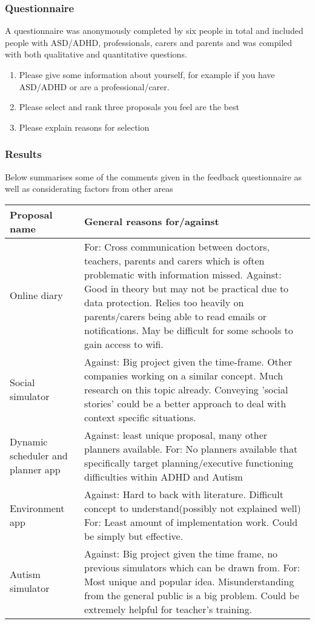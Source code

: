 \documentclass[11pt]{report}
\begin{document}
\subsubsection{Questionnaire}
A questionnaire was anonymously completed by six people in total and included people with ASD/ADHD, professionals, carers and parents and was compiled with both qualitative and quantitative questions.

\begin{enumerate}
\item Please give some information about yourself, for example if you have ASD/ADHD or are a professional/carer.
\item Please select and rank three proposals you feel are the best
\item Please explain reasons for selection
\end{enumerate}

\subsubsection{Results}

Below summarises some of the comments given in the feedback questionnaire as well as considerating factors from other areas

\begin{table}[H]
    \begin{tabular}{| p{4cm} | p{8cm} |}
    \hline
    Proposal name & General reasons for/against                                                                 \\
    \hline
    \hline
    Online diary & For: Cross communication between doctors, teachers, parents and carers which is often problematic with information missed. Against: Good in theory but may not be practical due to data protection. Relies too heavily on parents/carers being able to read emails or notifications. May be difficult for some schools to gain access to wifi.                \\
    \hline
    Social simulator & Against: Big project given the time-frame. Other companies working on a similar concept. Much research on this topic already. Conveying 'social stories' could be a better approach to deal with context specific situations. \\
    \hline
    Dynamic scheduler and planner app & Against: least unique proposal, many other planners available. For: No planners available that specifically target planning/executive functioning difficulties within ADHD and Autism \\
    \hline
    Environment app & Against: Hard to back with literature. Difficult concept to understand(possibly not explained well) For: Least amount of implementation work. Could be simply but effective. \\
    \hline
   Autism simulator & Against: Big project given the time frame, no previous simulators which can be drawn from. For: Most unique and popular idea. Misunderstanding from the general public is a big problem. Could be extremely helpful for teacher's training. \\
    \hline
    \end{tabular}
\end{table}
\end{document}
